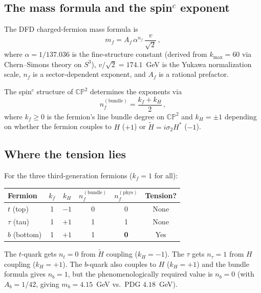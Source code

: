 \documentclass[11pt,a4paper]{article}
\newcommand{\CP}{\mathbb{CP}}
\theoremstyle{definition}
\theoremstyle{remark}
\begin{document}
\subsection{The mass formula and the spin$^c$ exponent}

The DFD charged-fermion mass formula is
\begin{equation}\label{eq:mass}
m_f = A_f\,\alpha^{n_f}\,\frac{v}{\sqrt{2}}\,,
\end{equation}
where $\alpha = 1/137.036$ is the fine-structure constant (derived from
$k_{\max} = 60$ via Chern--Simons theory on $S^3$),
$v/\sqrt{2} = 174.1$~GeV is the Yukawa normalization scale, $n_f$ is
a sector-dependent exponent, and $A_f$ is a rational prefactor.

The spin$^c$ structure of $\CP^2$ determines the exponents via
\begin{equation}\label{eq:spinc}
n_f^{(\text{bundle})} = \frac{k_f + k_H}{2}\,,
\end{equation}
where $k_f \geq 0$ is the fermion's line bundle degree on $\CP^2$ and
$k_H = \pm 1$ depending on whether the fermion couples to $H$ ($+1$)
or $\tilde{H} = i\sigma_2 H^*$ ($-1$).

\subsection{Where the tension lies}

For the three third-generation fermions ($k_f = 1$ for all):

\begin{center}
\renewcommand{\arraystretch}{1.2}
\begin{tabular}{lccccc}
\toprule
Fermion & $k_f$ & $k_H$ & $n_f^{(\text{bundle})}$ &
$n_f^{(\text{phys})}$ & Tension? \\
\midrule
$t$ (top) & 1 & $-1$ & 0 & 0 & None \\
$\tau$ (tau) & 1 & $+1$ & 1 & 1 & None \\
$b$ (bottom) & 1 & $+1$ & 1 & \textbf{0} &
\textcolor{fail}{Yes} \\
\bottomrule
\end{tabular}
\end{center}

The $t$-quark gets $n_t = 0$ from $\tilde{H}$ coupling ($k_H = -1$).
The $\tau$ gets $n_\tau = 1$ from $H$ coupling ($k_H = +1$).  The
$b$-quark also couples to $H$ ($k_H = +1$) and the bundle formula
gives $n_b = 1$, but the phenomenologically required value is
$n_b = 0$ (with $A_b = 1/42$, giving $m_b = 4.15$~GeV vs.\
PDG $4.18$~GeV).
\end{document}
